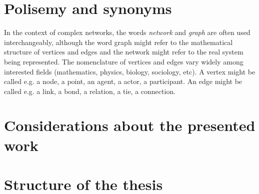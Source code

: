 \section{Polisemy and synonyms}
In the context of complex networks, the words \emph{network} and \emph{graph}
are often used interchangeably, although the word graph might refer to the
mathematical structure of vertices and edges and the network might refer to the
real system being represented.
The nomenclature of vertices and edges vary widely among interested fields (mathematics, physics, biology, sociology, etc).
A vertex might be called e.g. a node, a point, an agent, a actor, a participant.
An edge might be called e.g. a link, a bond, a relation, a tie, a connection.


\section{Considerations about the presented work}

\section{Structure of the thesis}
